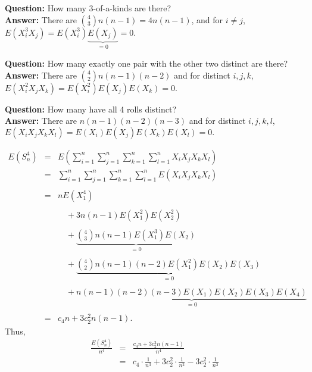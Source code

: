 \documentclass[12pt]{article}
\begin{document}
\vspace{0.25cm}

\noindent \textbf{Question: } How many 3-of-a-kinds are there? \\
\textbf{Answer:} There are ${4\choose 3}n(n-1)=4n(n-1)$, and for $i\ne j$, $E(X_i^3 X_j) = E(X_i^3) \underbrace{E(X_j)}_{=0} = 0. $ \\

\vspace{0.25cm}

\noindent \textbf{Question: } How many exactly one pair with the other two distinct are there? \\
\textbf{Answer:} There are ${4\choose 2}n(n-1)(n-2)$ and for distinct $i,j,k$, $E(X_i^2X_jX_k)=E(X_i^2)E(X_j)E(X_k)=0.$ \\

\vspace{0.25cm}

\noindent \textbf{Question: } How many have all 4 rolls distinct? \\
\textbf{Answer:} There are $n(n-1)(n-2)(n-3)$ and for distinct $i,j,k,l$,
$E(X_i X_j X_k X_l) = E(X_i)E(X_j)E(X_k)E(X_l) = 0. $ \\

\vspace{0.75cm}

\begin{eqnarray*}
    E(S_n^4) &=& E\left( \sum_{i=1}^n \sum_{j=1}^n \sum_{k=1}^n \sum_{l=1}^n X_i X_j X_k X_l \right) \\
    &=& \sum_{i=1}^n \sum_{j=1}^n \sum_{k=1}^n \sum_{l=1}^n E(X_i X_j X_k X_l) \\
    & & \\
    &=& n E(X_1^4) \\
    & & \\
    &  & \quad + 3n(n-1) E(X_1^2)E(X_2^2) \\
    & & \\
    &  & \quad + \underbrace{\binom{4}{3} n(n-1)E(X_1^3)E(X_2)}_{=0} \\
    & & \\
    &  & \quad + \underbrace{\binom{4}{2}n(n-1)(n-2)E(X_1^2)E(X_2)E(X_3)}_{= 0} \\
    & & \\
    &  & \quad + \underbrace{n(n-1)(n-2)(n-3) E(X_1)E(X_2)E(X_3)E(X_4)}_{= 0} \\
    & & \\
    &=&  c_4n + 3c_2^2n(n-1).
\end{eqnarray*}
Thus,
\begin{eqnarray*}
    \frac{E(S_n^4)}{n^4} &=& \frac{c_4n + 3c_2^2n(n-1)}{n^4} \\
    &=& c_4 \cdot \frac{1}{n^3} + 3 c_2^2 \cdot \frac{1}{n^2} - 3 c_2^2 \cdot \frac{1}{n^3}
\end{eqnarray*}
\end{document}
